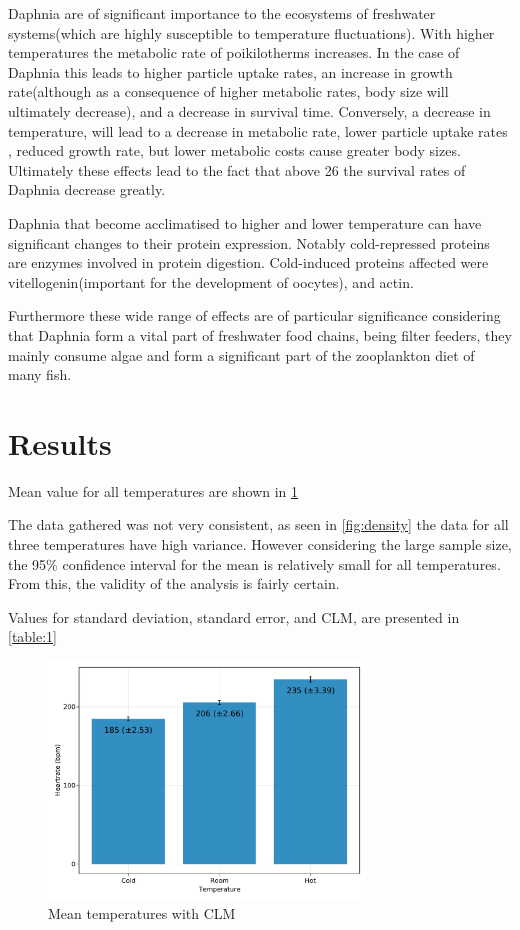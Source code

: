 \documentclass[a4paper, british]{article}
\begin{document}
Daphnia are of significant importance to the ecosystems of freshwater systems(which are highly susceptible to temperature fluctuations). With higher temperatures the metabolic rate of poikilotherms increases. In the case of Daphnia this leads to higher particle uptake rates, an increase in growth rate(although as a consequence of higher metabolic rates, body size will ultimately decrease), and a decrease in survival time. Conversely,  a decrease in temperature, will lead to a decrease in metabolic rate, lower particle uptake rates , reduced growth rate, but lower metabolic costs cause greater body sizes. Ultimately these effects lead to the fact that above 26 \textcelsius{} the survival rates of Daphnia decrease greatly.\cite{mullerTemperaturedrivenResponseReversibility2018}

Daphnia that become acclimatised to higher and lower temperature can have significant changes to their protein expression. Notably cold-repressed proteins are enzymes involved in protein digestion. Cold-induced proteins affected were vitellogenin(important for the development of oocytes), and actin.\cite{schwerinAcclimatoryResponsesDaphnia2009}

Furthermore these wide range of effects are of particular significance considering that Daphnia form a vital part of freshwater food chains, being filter feeders, they mainly consume algae and form a significant part of the zooplankton diet of many fish.\cite{santosoCardiovascularPerformanceMeasurement2020}

\section{Results}

Mean value for all temperatures are shown in \cref{fig:mean}

The data gathered was not very consistent, as seen in \cref{fig:density} the data for all three temperatures have high variance. However considering the large sample size, the 95\% confidence interval for the mean is relatively small for all temperatures. From this, the validity of the analysis is fairly certain.

Values for standard deviation, standard error, and CLM, are presented in \cref{table:1}

\begin{figure}[htb]
    \centering
    \includegraphics[width=0.75\textwidth]{figures/plot1.pdf}
    \caption{Mean temperatures with CLM}
    \label{fig:mean}
\end{figure}
\end{document}
